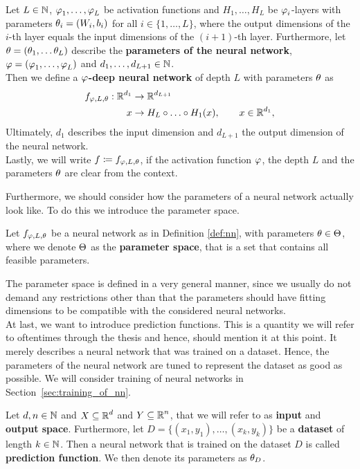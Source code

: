 \begin{definition}\label{def:nn}
Let $L\in\operatorname{\mathbb{N}}$, $\operatorname{\varphi}_1,\ldots,\operatorname{\varphi}_L$ be activation functions and $H_1, \ldots, H_L$ be $\operatorname{\varphi}_i$-layers with parameters $\theta_i = (W_i, b_i)$ for all $i \in \{1,\ldots,L\}$, where the output dimensions of the $i$-th layer equals the input dimensions of the $(i+1)$-th layer. Furthermore, let  $\theta = (\theta_1, \ldots \theta_L)$ describe the \textbf{parameters of the neural network}, $\operatorname{\varphi} = (\operatorname{\varphi}_1, \ldots, \operatorname{\varphi}_L)$ and $d_1,\ldots,d_{L+1}\in\operatorname{\mathbb{N}}$.\\
Then we define a \textbf{$\operatorname{\varphi}$-deep neural network} of depth $L$ with parameters $\theta$ as
\begin{align}
f_{\operatorname{\varphi}, L, \theta}: \operatorname{\mathbb{R}}^{d_1} &\to \operatorname{\mathbb{R}}^{d_{L+1}}\nonumber\\
x &\to H_L \circ \ldots \circ H_1 (x), \qquad x \in \operatorname{\mathbb{R}}^{d_1},
\end{align}
Ultimately, $d_1$ describes the input dimension and $d_{L+1}$ the output dimension of the neural network.\\
Lastly, we will write $f\coloneqq f_{\operatorname{\varphi}, L, \theta}$, if the activation function $\operatorname{\varphi}$, the depth $L$ and the parameters $\theta$ are clear from the context.
\end{definition}

Furthermore, we should consider how the parameters of a neural network actually look like. To do this we introduce the parameter space.

\begin{definition}
Let $f_{\operatorname{\varphi}, L, \theta}$ be a neural network as in Definition \ref{def:nn}, with parameters $\theta\in\operatorname{\Theta}$, where we denote $\operatorname{\Theta}$ as the \textbf{parameter space}, that is a set that contains all feasible parameters.
\end{definition}

The parameter space is defined in a very general manner, since we usually do not demand any restrictions other than that the parameters should have fitting dimensions to be compatible with the considered neural networks.\\
At last, we want to introduce prediction functions. This is a quantity we will refer to oftentimes through the thesis and hence, should mention it at this point. It merely describes a neural network that was trained on a dataset. Hence, the parameters of the neural network are tuned to represent the dataset as good as possible. We will consider training of neural networks in Section~\ref{sec:training_of_nn}.

\begin{definition}
Let $d, n \in \operatorname{\mathbb{N}}$ and $X\subseteq \operatorname{\mathbb{R}}^d$ and $Y \subseteq \operatorname{\mathbb{R}}^n$, that we will refer to as \textbf{input} and \textbf{output space}. Furthermore, let $D=\{(x_1,y_1),\ldots, (x_k,y_k)\}$ be a \textbf{dataset} of length $k\in\operatorname{\mathbb{N}}$. Then a neural network that is trained on the dataset $D$ is called \textbf{prediction function}. We then denote its parameters as $\theta_{D}$.
\end{definition}


